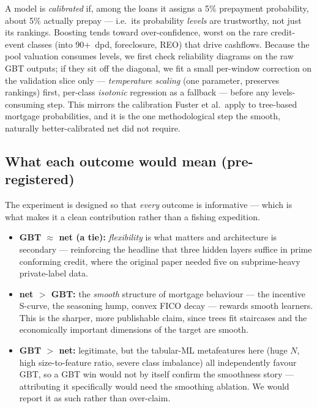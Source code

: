 \documentclass[11pt]{article}
\begin{document}
\begin{jargon}
A model is \emph{calibrated} if, among the loans it assigns a 5\% prepayment probability, about
5\% actually prepay --- i.e.\ its probability \emph{levels} are trustworthy, not just its
rankings. Boosting tends toward over-confidence, worst on the rare credit-event classes (into
90+~dpd, foreclosure, REO) that drive cashflows. Because the pool valuation consumes levels, we
first check reliability diagrams on the raw GBT outputs; if they sit off the diagonal, we fit a
small per-window correction on the validation slice only --- \emph{temperature scaling} (one
parameter, preserves rankings) first, per-class \emph{isotonic} regression as a fallback ---
before any levels-consuming step. This mirrors the calibration Fuster et al.\ apply to
tree-based mortgage probabilities, and it is the one methodological step the smooth, naturally
better-calibrated net did not require.
\end{jargon}

\subsection{What each outcome would mean (pre-registered)}

The experiment is designed so that \emph{every} outcome is informative --- which is what makes it
a clean contribution rather than a fishing expedition.

\begin{itemize}[leftmargin=1.4em, itemsep=3pt]
  \item \textbf{GBT $\approx$ net (a tie):} \emph{flexibility} is what matters and architecture
        is secondary --- reinforcing the headline that three hidden layers suffice in prime
        conforming credit, where the original paper needed five on subprime-heavy private-label
        data.
  \item \textbf{net $>$ GBT:} the \emph{smooth} structure of mortgage behaviour --- the incentive
        S-curve, the seasoning hump, convex FICO decay --- rewards smooth learners. This is the
        sharper, more publishable claim, since trees fit staircases and the economically
        important dimensions of the target are smooth.
  \item \textbf{GBT $>$ net:} legitimate, but the tabular-ML metafeatures here (huge $N$, high
        size-to-feature ratio, severe class imbalance) all independently favour GBT, so a GBT win
        would not by itself confirm the smoothness story --- attributing it specifically would
        need the smoothing ablation. We would report it as such rather than over-claim.
\end{itemize}
\end{document}

